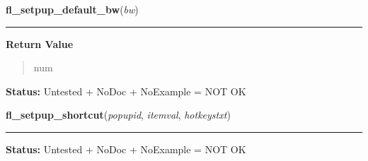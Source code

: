     \label{xformslib:library:fl_setpup_default_bw}

    \vspace{0.5ex}

\hspace{.8\funcindent}\begin{boxedminipage}{\funcwidth}

    \raggedright \textbf{fl\_setpup\_default\_bw}(\textit{bw})

    \vspace{-1.5ex}

    \rule{\textwidth}{0.5\fboxrule}
\setlength{\parskip}{2ex}
\setlength{\parskip}{1ex}
      \textbf{Return Value}
    \vspace{-1ex}

      \begin{quote}
      num

      \end{quote}

\textbf{Status:} Untested + NoDoc + NoExample = NOT OK



    \end{boxedminipage}

    \label{xformslib:library:fl_setpup_shortcut}

    \vspace{0.5ex}

\hspace{.8\funcindent}\begin{boxedminipage}{\funcwidth}

    \raggedright \textbf{fl\_setpup\_shortcut}(\textit{popupid}, \textit{itemval}, \textit{hotkeystxt})

    \vspace{-1.5ex}

    \rule{\textwidth}{0.5\fboxrule}
\setlength{\parskip}{2ex}
\setlength{\parskip}{1ex}
\textbf{Status:} Untested + NoDoc + NoExample = NOT OK



    \end{boxedminipage}

    \label{xformslib:library:fl_setpup_position}

